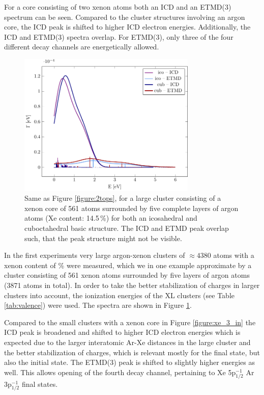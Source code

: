 For a core consisting of two xenon atoms both an ICD and an ETMD(3) spectrum
can be seen. Compared to the cluster structures involving an argon core, the ICD peak is
shifted to higher ICD electron energies. 
Additionally, the ICD and ETMD(3) spectra overlap.
For ETMD(3), only three of the four different decay channels are
energetically allowed.

\begin{figure}[ht]
 \centering
 \includegraphics[width=8.5cm]{pics/c6l5.pdf}
 \caption{Same as Figure \protect\ref{figure:2tops},
          for a large cluster consisting
          of a xenon core of 561 atoms surrounded by five complete layers of
          argon atoms (Xe content: 14.5\,\%) for both an icosahedral and
          cuboctahedral basic structure.
          The ICD and ETMD peak overlap such, that the peak
          structure might not be visible.}
 \label{figure:xe_6_lay5}
\end{figure}
%
In the first experiments very large argon-xenon clusters of 
$\approx 4380$ atoms with a xenon content of \unit[19]{\%}
were measured,\cite{Mucke_phd}
which we in one example approximate by a cluster consisting of 561 xenon
atoms surrounded
by five layers of argon atoms (3871 atoms in total). In order to take the
better stabilization of charges in larger clusters into account, the
ionization energies of the XL clusters (see Table \ref{tab:valence})
were used.
The spectra are shown in 
Figure \ref{figure:xe_6_lay5}.

Compared to the small clusters with a xenon core in Figure \ref{figure:xe_3_in}
the ICD peak is broadened and shifted to higher ICD electron energies which is
expected due to the larger interatomic Ar-Xe distances in the large cluster and
the better stabilization of charges, which is relevant mostly for the final state, but also the initial state.
The ETMD(3) peak is shifted to slightly higher energies as well. This allows opening of the
fourth decay channel, pertaining to Xe 5p$_{1/2}^{-1}$ Ar 3p$_{1/2}^{-1}$ final states.

